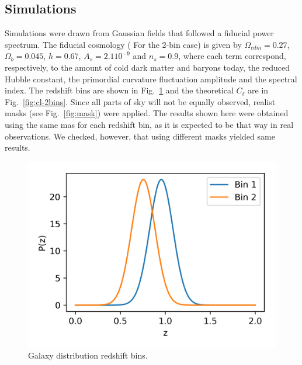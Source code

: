 \documentclass[a4paper,11pt]{article}
\newcommand{\cl}{C_\ell}
\newcommand{\red}[1]{{\color{red} #1}}
\begin{document}
\subsection{Simulations}

Simulations were drawn from Gaussian fields that followed a fiducial power
spectrum. The fiducial cosmology (\red{For the 2-bin case}) is given by
$\Omega_{cdm} = 0.27$, $\Omega_b = 0.045$, $h = 0.67$, $A_s = 2.1 10^{-9}$ and
$n_s = 0.9$, where each term correspond, respectively, to the amount of cold
dark matter and baryons today, the reduced Hubble constant, the primordial
curvature fluctuation amplitude and the spectral index. The redshift bins are
shown in Fig.~\ref{fig:pz} and the theoretical $\cl$ are in
Fig.~\ref{fig:cl-2bins}. Since all parts of sky will not be equally observed,
realist masks (see Fig.~\ref{fig:mask}) were applied.  The results shown here
were obtained using the same mas for each redshift bin, as it is expected to
be that way in real observations. We checked, however, that using different
masks yielded same results. 

\begin{figure}
  \centering
  \includegraphics[width=\columnwidth]{./figures/pz.png}
  \caption{Galaxy distribution redshift bins.}
  \label{fig:pz}
\end{figure}
\end{document}
